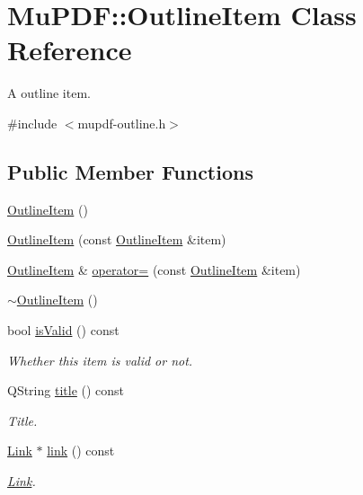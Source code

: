 \hypertarget{class_mu_p_d_f_1_1_outline_item}{\section{Mu\-P\-D\-F\-:\-:Outline\-Item Class Reference}
\label{class_mu_p_d_f_1_1_outline_item}
}


A outline item.  




{\ttfamily \#include $<$mupdf-\/outline.\-h$>$}

\subsection*{Public Member Functions}
\begin{DoxyCompactItemize}
\item 
\hyperlink{class_mu_p_d_f_1_1_outline_item_a7becb50f8c420c97e91ad7447db4352e}{Outline\-Item} ()
\item 
\hyperlink{class_mu_p_d_f_1_1_outline_item_a2b12873e1a87c12934f5f4b50db4b462}{Outline\-Item} (const \hyperlink{class_mu_p_d_f_1_1_outline_item}{Outline\-Item} \&item)
\item 
\hyperlink{class_mu_p_d_f_1_1_outline_item}{Outline\-Item} \& \hyperlink{class_mu_p_d_f_1_1_outline_item_acbb658a651ca336b1fc63ab638ebe2bb}{operator=} (const \hyperlink{class_mu_p_d_f_1_1_outline_item}{Outline\-Item} \&item)
\item 
\hyperlink{class_mu_p_d_f_1_1_outline_item_aaed50f784c03ff8b1e83cc14d15c6ebc}{$\sim$\-Outline\-Item} ()
\item 
bool \hyperlink{class_mu_p_d_f_1_1_outline_item_a0f8f4d3f59da951e5a9f4d467846d97f}{is\-Valid} () const 
\begin{DoxyCompactList}\small\item\em Whether this item is valid or not. \end{DoxyCompactList}\item 
Q\-String \hyperlink{class_mu_p_d_f_1_1_outline_item_a39279fb107effca0ee53f0931d06260d}{title} () const 
\begin{DoxyCompactList}\small\item\em Title. \end{DoxyCompactList}\item 
\hyperlink{class_mu_p_d_f_1_1_link}{Link} $\ast$ \hyperlink{class_mu_p_d_f_1_1_outline_item_afe6250e9dd784104369ed0f4178ed113}{link} () const 
\begin{DoxyCompactList}\small\item\em \hyperlink{class_mu_p_d_f_1_1_link}{Link}. \end{DoxyCompactList}\item 

\end{DoxyCompactItemize}
